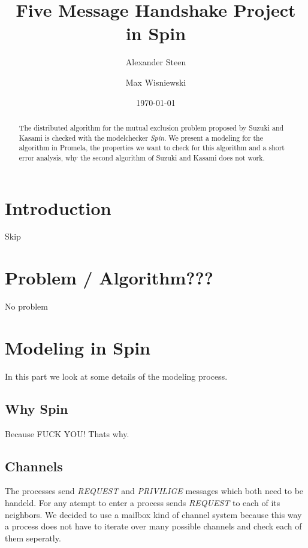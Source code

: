 \documentclass{llncs}
\title{Five Message Handshake Project in Spin}
\author{Alexander Steen \and Max Wisniewski}
\date{\today}
\institute{Institut f\"ur Informatik, FU Berlin}
\begin{document}
\maketitle

\begin{abstract}
The distributed algorithm for the mutual exclusion problem proposed by Suzuki and Kasami \cite{blub} is checked
with the modelchecker \emph{Spin}. We present a modeling for the algorithm in Promela, the properties we want
to check for this algorithm and a short error analysis, why the second algorithm of Suzuki and Kasami does not work.
\end{abstract}



\section{Introduction}

Skip



\section{Problem / Algorithm???}

No problem



\section{Modeling in Spin}

In this part we look at some details of the modeling process.

\subsection{Why Spin}

Because FUCK YOU! Thats why.

\subsection{Channels}

The processes send \emph{REQUEST} and \emph{PRIVILIGE} messages which both
need to be handeld. For any atempt to enter a process sends \emph{REQUEST} to
each of its neighbors. We decided to use a mailbox kind of channel system because
this way a process does not have to iterate over many possible channels and check
each of them seperatly.
\end{document}
